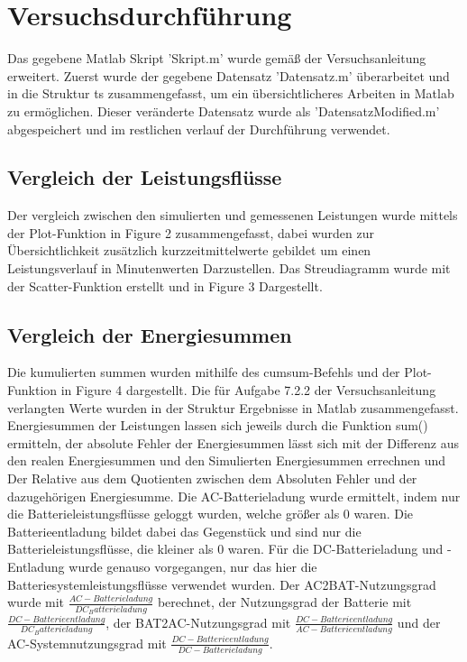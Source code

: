 \newpage
\section{Versuchsdurchführung}
Das gegebene Matlab Skript 'Skript.m' wurde gemäß der Versuchsanleitung \cite[S. 11]{Laboranleitung} erweitert.
Zuerst wurde der gegebene Datensatz 'Datensatz.m' überarbeitet und in die Struktur ts zusammengefasst, um ein übersichtlicheres Arbeiten in Matlab zu ermöglichen.
Dieser veränderte Datensatz wurde als 'DatensatzModified.m' abgespeichert und im restlichen verlauf der Durchführung verwendet.
\subsection{Vergleich der Leistungsflüsse}
Der vergleich zwischen den simulierten und gemessenen Leistungen wurde mittels der Plot-Funktion in Figure 2 zusammengefasst, dabei wurden zur Übersichtlichkeit zusätzlich kurzzeitmittelwerte gebildet um einen Leistungsverlauf in Minutenwerten Darzustellen.
Das Streudiagramm wurde mit der Scatter-Funktion erstellt und in Figure 3 Dargestellt.
\subsection{Vergleich der Energiesummen}
Die kumulierten summen wurden mithilfe des cumsum-Befehls und der Plot-Funktion in Figure 4 dargestellt.
Die für Aufgabe 7.2.2 der Versuchsanleitung \cite[S. 11]{Laboranleitung} verlangten Werte wurden in der Struktur Ergebnisse in Matlab zusammengefasst.
Energiesummen der Leistungen lassen sich jeweils durch die Funktion sum() ermitteln, der absolute Fehler der Energiesummen lässt sich mit der Differenz aus den realen Energiesummen und den Simulierten Energiesummen errechnen und Der Relative aus dem Quotienten zwischen dem Absoluten Fehler und der dazugehörigen Energiesumme.
Die AC-Batterieladung wurde ermittelt, indem nur die Batterieleistungsflüsse geloggt wurden, welche größer als 0 waren.
Die Batterieentladung bildet dabei das Gegenstück und sind nur die Batterieleistungsflüsse, die kleiner als 0 waren.
Für die DC-Batterieladung und -Entladung wurde genauso vorgegangen, nur das hier die Batteriesystemleistungsflüsse verwendet wurden.
Der AC2BAT-Nutzungsgrad wurde mit $\frac{AC-Batterieladung}{DC_Batterieladung}$ berechnet, der Nutzungsgrad der Batterie mit $\frac{DC-Batterieentladung}{DC_Batterieladung}$, der BAT2AC-Nutzungsgrad mit $\frac{DC-Batterieentladung}{AC-Batterieentladung}$ und der AC-Systemnutzungsgrad mit $\frac{DC-Batterieentladung}{DC-Batterieladung}$.

